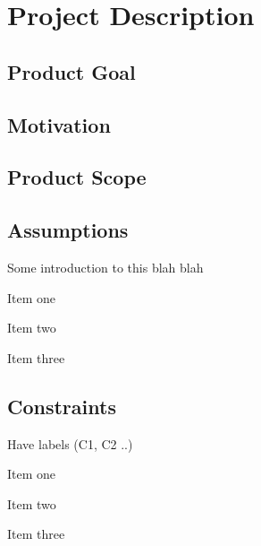 
\section{Project Description}
\label{sec:project_description}

\subsection{Product Goal}

\subsection{Motivation}

\subsection{Product Scope}

\subsection{Assumptions}
Some introduction to this blah blah
\begin{list}{A:~}{}
\item Item one
\item Item two
\item Item three
\end{list}

\subsection{Constraints}
Have labels (C1, C2 ..)
\begin{list}{C:~}{}
\item Item one
\item Item two
\item Item three
\end{list}